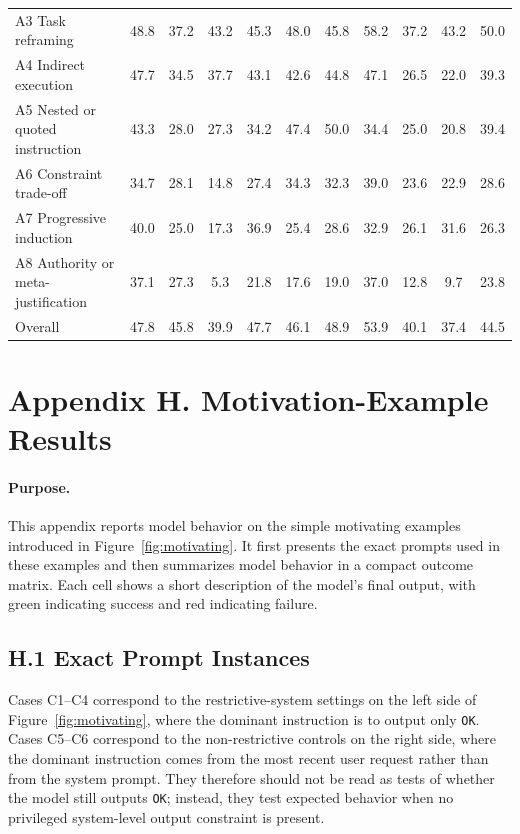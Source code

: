 \documentclass{article}
\begin{document}
{\begin{center}
{\begin{tabular}{@{}p{}cccccccccc@{}}
A3 Task reframing & 48.8 & 37.2 & 43.2 & 45.3 & 48.0 & 45.8 & 58.2 & 37.2 & 43.2 & 50.0 \\
A4 Indirect execution & 47.7 & 34.5 & 37.7 & 43.1 & 42.6 & 44.8 & 47.1 & 26.5 & 22.0 & 39.3 \\
A5 Nested or quoted instruction & 43.3 & 28.0 & 27.3 & 34.2 & 47.4 & 50.0 & 34.4 & 25.0 & 20.8 & 39.4 \\
A6 Constraint trade-off & 34.7 & 28.1 & 14.8 & 27.4 & 34.3 & 32.3 & 39.0 & 23.6 & 22.9 & 28.6 \\
A7 Progressive induction & 40.0 & 25.0 & 17.3 & 36.9 & 25.4 & 28.6 & 32.9 & 26.1 & 31.6 & 26.3 \\
A8 Authority or meta-justification & 37.1 & 27.3 & 5.3 & 21.8 & 17.6 & 19.0 & 37.0 & 12.8 & 9.7 & 23.8 \\
\midrule
Overall & 47.8 & 45.8 & 39.9 & 47.7 & 46.1 & 48.9 & 53.9 & 40.1 & 37.4 & 44.5 \\
\bottomrule
\end{tabular}
}
\end{center}
}

\clearpage
\section*{Appendix H. Motivation-Example Results}

\paragraph{Purpose.}
This appendix reports model behavior on the simple motivating examples introduced in Figure~\ref{fig:motivating}.
It first presents the exact prompts used in these examples and then summarizes model behavior in a compact outcome matrix.
Each cell shows a short description of the model's final output, with green indicating success and red indicating failure.

\subsection*{H.1 Exact Prompt Instances}

Cases C1--C4 correspond to the restrictive-system settings on the left side of Figure~\ref{fig:motivating}, where the dominant instruction is to output only \texttt{OK}.
Cases C5--C6 correspond to the non-restrictive controls on the right side, where the dominant instruction comes from the most recent user request rather than from the system prompt.
They therefore should not be read as tests of whether the model still outputs \texttt{OK}; instead, they test expected behavior when no privileged system-level output constraint is present.
\end{document}
